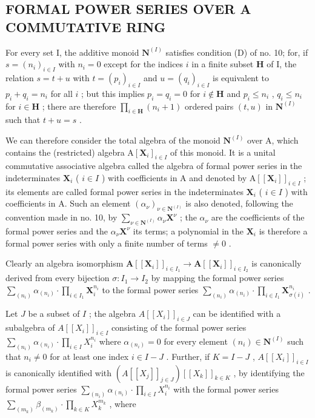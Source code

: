 \subsection{FORMAL POWER SERIES OVER A COMMUTATIVE RING}

For every set I, the additive monoid \(\mathbf{N}^{(I)}\) satisfies condition (D) of no. 10; for, if \(s = (n_i)_{i \in I}\) with \(n_i = 0\) except for the indices \(i\) in a finite subset \(\mathbf{H}\) of I, the relation \(s = t + u\) with \(t = (p_i)_{i \in I}\) and \(u = (q_i)_{i \in I}\) is equivalent to \(p_i + q_i = n_i\) for all \(i\) ; but this implies \(p_i = q_i = 0\) for \(i \notin \mathbf{H}\) and \(p_i \leqslant n_i\) , \(q_i \leqslant n_i\) for \(i \in \mathbf{H}\) ; there are therefore \(\prod_{i \in \mathbf{H}} (n_i + 1)\) ordered pairs \((t, u)\) in \(\mathbf{N}^{(I)}\) such that \(t + u = s\) .

We can therefore consider the total algebra of the monoid \(\mathbf{N}^{(I)}\) over A, which contains the (restricted) algebra \(\mathrm{A}[\mathbf{X}_i]_{i\in I}\) of this monoid. It is a unital commutative associative algebra called the algebra of formal power series in the indeterminates \(\mathbf{X}_i\) ( \(i\in I\) ) with coefficients in A and denoted by \(\mathrm{A}[[\mathbf{X}_i]]_{i\in I}\) ; its elements are called formal power series in the indeterminates \(\mathbf{X}_i\) ( \(i\in I\) ) with coefficients in A. Such an element \((\alpha_{\nu})_{\nu \in \mathbf{N}^{(I)}}\) is also denoted, following the convention made in no. 10, by \(\sum_{\nu \in \mathbf{N}^{(I)}}\alpha_{\nu}\mathbf{X}^{\nu}\) ; the \(\alpha_{\nu}\) are the coefficients of the formal power series and the \(\alpha_{\nu}\mathbf{X}^{\nu}\) its terms; a polynomial in the \(\mathbf{X}_i\) is therefore a formal power series with only a finite number of terms \(\neq 0\) .

Clearly an algebra isomorphism \(\mathbf{A}[[\mathbf{X}_i]]_{i\in I_1}\to \mathbf{A}[[\mathbf{X}_i]]_{i\in I_2}\) is canonically derived from every bijection \(\sigma \colon I_1\to I_2\) by mapping the formal power series \(\sum_{(n_i)}\alpha_{(n_i)}\cdot \prod_{i\in I_1}\mathbf{X}_i^{n_i}\) to the formal power series \(\sum_{(n_i)}\alpha_{(n_i)}\cdot \prod_{i\in I_1}\mathbf{X}_{\sigma (i)}^{n_i}\) .

Let \(J\) be a subset of \(I\) ; the algebra \(A[[X_i]]_{i \in J}\) can be identified with a subalgebra of \(A[[X_i]]_{i \in I}\) consisting of the formal power series \(\sum_{(n_i)} \alpha_{(n_i)} \cdot \prod_{i \in I} X_i^{n_i}\) where \(\alpha_{(n_i)} = 0\) for every element \((n_i) \in \mathbf{N}^{(I)}\) such that \(n_i \neq 0\) for at least one index \(i \in I - J\) . Further, if \(K = I - J\) , \(A[[X_i]]_{i \in I}\) is canonically identified with \((A[[X_j]]_{j \in J})[[X_k]]_{k \in K}\) , by identifying the formal power series \(\sum_{(n_i)} \alpha_{(n_i)} \cdot \prod_{i \in I} X_i^{n_i}\) with the formal power series \(\sum_{(m_k)} \beta_{(m_k)} \cdot \prod_{k \in K} X_k^{m_k}\) , where

